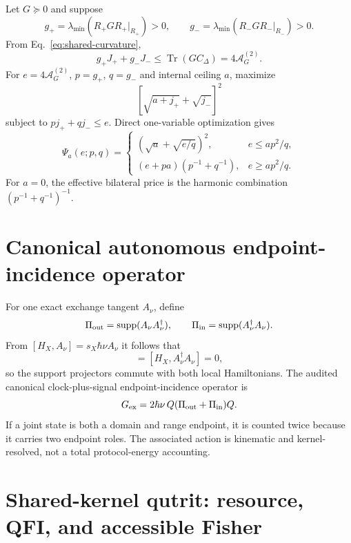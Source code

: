 \documentclass[aps,pra,preprint,nofootinbib]{revtex4-2}
\newcommand{\Tr}{\operatorname{Tr}}
\newcommand{\supp}{\operatorname{supp}}
\newcommand{\Aact}{\mathcal A}
\begin{document}
Let $G\succeq0$ and suppose
\begin{equation}
g_+=\lambda_{\min}(R_+GR_+|_{R_+})>0,
\qquad
g_-=\lambda_{\min}(R_-GR_-|_{R_-})>0.
\end{equation}
From Eq.~\eqref{eq:shared-curvature},
\begin{equation}
g_+J_+ +g_-J_-
\le\Tr(GC_\Delta)=4\Aact_G^{(2)}.
\end{equation}
For $e=4\Aact_G^{(2)}$, $p=g_+$, $q=g_-$ and internal ceiling $a$, maximize
\begin{equation}
\left[\sqrt{a+j_+}+\sqrt{j_-}\right]^2
\end{equation}
subject to $pj_++qj_-\le e$. Direct one-variable optimization gives
\begin{equation}
\Psi_a(e;p,q)=
\begin{cases}
(\sqrt a+\sqrt{e/q})^2,&e\le ap^2/q,\\[1mm]
(e+pa)(p^{-1}+q^{-1}),&e\ge ap^2/q.
\end{cases}
\end{equation}
For $a=0$, the effective bilateral price is the harmonic combination $(p^{-1}+q^{-1})^{-1}$.

\section{Canonical autonomous endpoint-incidence operator}
\label{supp:canonical-action}

For one exact exchange tangent $A_\nu$, define
\begin{equation}
\Pi_{\rm out}=\supp(A_\nu A_\nu^\dagger),
\qquad
\Pi_{\rm in}=\supp(A_\nu^\dagger A_\nu).
\end{equation}
From $[H_X,A_\nu]=s_X\hbar\nu A_\nu$ it follows that
\begin{equation}
[H_X,A_\nu A_\nu^\dagger]=[H_X,A_\nu^\dagger A_\nu]=0,
\end{equation}
so the support projectors commute with both local Hamiltonians. The audited canonical clock-plus-signal endpoint-incidence operator is
\begin{equation}
G_{\rm ex}=2\hbar\nu\,Q(\Pi_{\rm out}+\Pi_{\rm in})Q.
\end{equation}
If a joint state is both a domain and range endpoint, it is counted twice because it carries two endpoint roles. The associated action is kinematic and kernel-resolved, not a total protocol-energy accounting.

\section{Shared-kernel qutrit: resource, QFI, and accessible Fisher}
\label{supp:qutrit}
\end{document}
